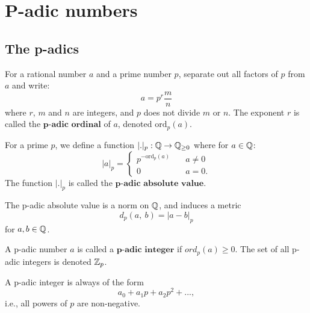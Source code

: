 \chapter{P-adic numbers}%
\label{sec:p-adics}

\section{The p-adics}

\begin{defn}
For a rational number $a$ and a prime number $p$, separate out all factors of $p$ from $a$ and write: $$ a = p^r \dfrac{m}{n} $$ where $r$, $m$ and $n$ are integers, and $p$ does not divide $m$ or $n$. The exponent $r$ is called the $\textbf{p-adic ordinal}$ of $a$, denoted $\text{ord}_p(a)$.
\end{defn}

\begin{defn}
For a prime $p$, we define a function $|.|_p : \mathbb{Q} \to \mathbb{Q}_{\ge 0}$ where for $a \in \mathbb{Q}$:
$$
|a|_p = \left\{
        \begin{array}{ll}
            p^{-\text{ord}_p(a)} & \quad a \neq 0 \\
            0 & \quad a = 0.
        \end{array}
    \right.
$$
The function $|.|_p$ is called the $\textbf{p-adic absolute value}$.
\end{defn}

\begin{prop}
The p-adic absolute value is a norm on $\mathbb{Q}$, and induces a metric $$d_p(a, \ b) = | a - b |_p$$ for $a, b \in \mathbb{Q}$.
\end{prop}

\begin{defn}
A p-adic number $a$ is called a $\textbf{p-adic integer}$ if $ord_p(a) \ge 0$. The set of all p-adic integers is
denoted $\mathbb{Z}_p$.
\end{defn}

\begin{rmk}
A p-adic integer is always of the form $$a_0 + a_1p + a_2p^2 + ... ,$$ i.e., all powers of $p$ are non-negative.
\end{rmk}
